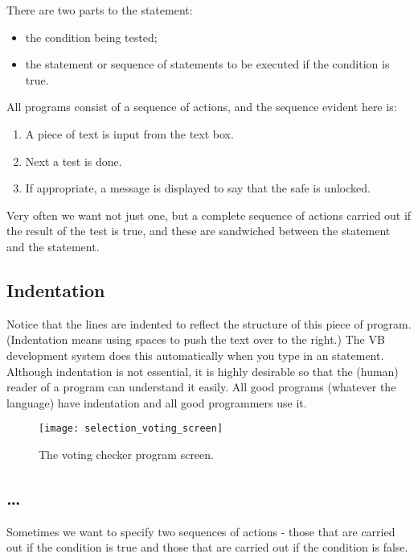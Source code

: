 		There are two parts to the  statement:
		\begin{itemize}
				\item the condition being tested;
				\item the statement or sequence of statements to be executed if the condition is true.
		\end{itemize}
		All programs consist of a sequence of actions, and the sequence evident here is:
		\begin{enumerate}
			\item	A piece of text is input from the text box.
			\item Next a test is done.
			\item	If appropriate, a message is displayed to say that the safe is unlocked.
		\end{enumerate}
		Very often we want not just one, but a complete sequence of actions carried out if the result of the test is true, and these are sandwiched between the  statement and the  statement.
	
		\subsection*{Indentation}
			Notice that the lines are indented to reflect the structure of this piece of program. (Indentation means using spaces to push the text over to the right.) The VB development system does this automatically when you type in an  statement. Although indentation is not essential, it is highly desirable so that the (human) reader of a program can understand it easily. All good programs (whatever the language) have indentation and all good programmers use it.

			\begin{figure}[th]
				\centering
				\texttt{[image: selection\_voting\_screen]}
				\caption{The voting checker program screen.}
				\label{fig:selection_voting_screen}
			\end{figure}


		\subsection*{…}
			Sometimes we want to specify two sequences of actions - those that are carried out if the condition is true and those that are carried out if the condition is false.
			
